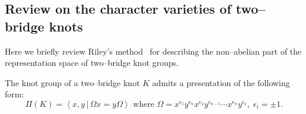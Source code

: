 \documentclass[a4paper]{amsart}
\theoremstyle{plain}
\theoremstyle{definition}
\theoremstyle{remark}
\newcommand{\ZZ}{{\mathbb Z}}
\newcommand{\C}{{\mathbb C}}
\newcommand{\SL}{{\mathrm{SL}_2(\C)}}
\begin{document}
%



\subsection{Review on  the character varieties of  two--bridge knots}
\label{ReviewCharK}
Here we briefly review Riley's method~\cite{Riley} for describing the non--abelian part of the representation space of two--bridge knot groups.

The knot group of a two--bridge knot $K$ admits a presentation of the following form:
\begin{equation}\label{P:G2B} 
\Pi(K)=\left\langle {x,y \, | \, \Omega x=y \Omega} \right\rangle  \text{ where } \Omega=x^{\epsilon_1}y^{\epsilon_n}x^{\epsilon_2}y^{\epsilon_{n-1}}\dotsb x^{\epsilon_n}y^{\epsilon_1}, \; \epsilon_i = \pm 1.
\end{equation}
  
\end{document}
